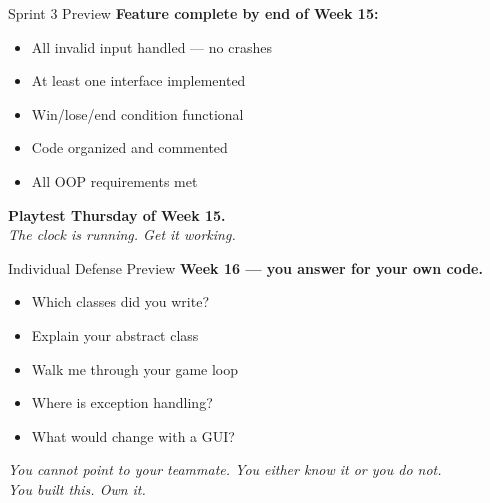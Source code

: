 \documentclass{beamer}
\begin{document}
\begin{frame}{Sprint 3 Preview}
\textbf{Feature complete by end of Week 15:}
\vspace{0.2cm}
\begin{itemize}
  \item All invalid input handled --- no crashes
  \item At least one interface implemented
  \item Win/lose/end condition functional
  \item Code organized and commented
  \item All OOP requirements met
\end{itemize}
\vspace{0.3cm}
\textbf{Playtest Thursday of Week 15.}\\
\textit{The clock is running. Get it working.}
\end{frame}
\begin{frame}{Individual Defense Preview}
\textbf{Week 16 --- you answer for your own code.}
\vspace{0.2cm}
\begin{itemize}
  \item Which classes did you write?
  \item Explain your abstract class
  \item Walk me through your game loop
  \item Where is exception handling?
  \item What would change with a GUI?
\end{itemize}
\vspace{0.3cm}
\textit{You cannot point to your teammate. You either know it or you do not.}\\
\vspace{0.3cm}
\textit{You built this. Own it.}
\end{frame}
\end{document}
